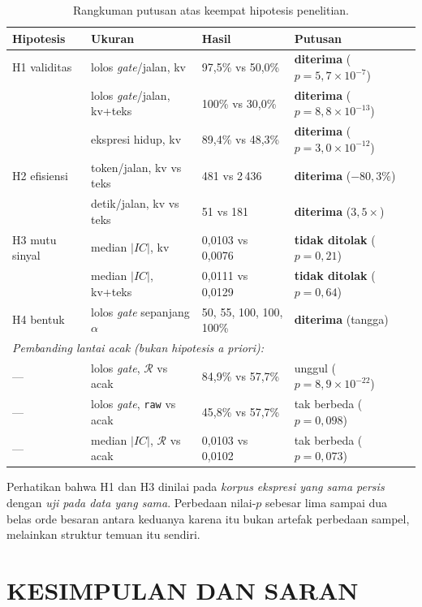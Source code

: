 \documentclass{laporanta1statugm}
\newcommand{\code}[1]{\texttt{#1}}
\begin{document}
\begin{table}[htbp]
\centering
\caption{Rangkuman putusan atas keempat hipotesis penelitian.}
\label{tab:hipotesis}
\small
\begin{tabular}{llll}
\hline
Hipotesis & Ukuran & Hasil & Putusan \\
\hline
H1 validitas & lolos \textit{gate}/jalan, kv & 97,5\% vs 50,0\% &
  \textbf{diterima} ($p=5{,}7\times10^{-7}$) \\
 & lolos \textit{gate}/jalan, kv+teks & 100\% vs 30,0\% &
  \textbf{diterima} ($p=8{,}8\times10^{-13}$) \\
 & ekspresi hidup, kv & 89,4\% vs 48,3\% &
  \textbf{diterima} ($p=3{,}0\times10^{-12}$) \\
H2 efisiensi & token/jalan, kv vs teks & 481 vs 2\,436 &
  \textbf{diterima} ($-80{,}3\%$) \\
 & detik/jalan, kv vs teks & 51 vs 181 & \textbf{diterima} ($3{,}5\times$) \\
H3 mutu sinyal & median $|IC|$, kv & 0,0103 vs 0,0076 &
  \textbf{tidak ditolak} ($p=0{,}21$) \\
 & median $|IC|$, kv+teks & 0,0111 vs 0,0129 &
  \textbf{tidak ditolak} ($p=0{,}64$) \\
H4 bentuk & lolos \textit{gate} sepanjang $\alpha$ &
  50, 55, 100, 100, 100\% & \textbf{diterima} (tangga) \\
\hline
\multicolumn{4}{l}{\textit{Pembanding lantai acak (bukan hipotesis a priori):}} \\
--- & lolos \textit{gate}, $\mathcal{R}$ vs acak & 84,9\% vs 57,7\% &
  unggul ($p=8{,}9\times10^{-22}$) \\
--- & lolos \textit{gate}, \code{raw} vs acak & 45,8\% vs 57,7\% &
  tak berbeda ($p=0{,}098$) \\
--- & median $|IC|$, $\mathcal{R}$ vs acak & 0,0103 vs 0,0102 &
  tak berbeda ($p=0{,}073$) \\
\hline
\end{tabular}
\end{table}

Perhatikan bahwa H1 dan H3 dinilai pada \emph{korpus ekspresi yang sama persis}
dengan \emph{uji pada data yang sama}. Perbedaan nilai-$p$ sebesar lima sampai
dua belas orde besaran antara keduanya karena itu bukan artefak perbedaan
sampel, melainkan struktur temuan itu sendiri.

\chapter{KESIMPULAN DAN SARAN}
\end{document}
